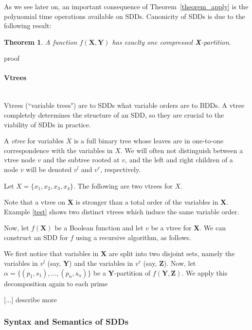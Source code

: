 \documentclass[12]{article}
\newtheorem{theorem}{Theorem}[section]
\newenvironment{proof}[1][Proof]{\begin{trivlist}
\item[\hskip \labelsep {\bfseries #1}]}{\end{trivlist}}
\newenvironment{definition}[1][Definition]{\begin{trivlist}
\item[\hskip \labelsep {\bfseries #1}]}{\end{trivlist}}
\newenvironment{example}[1][Example]{\begin{trivlist}
\item[\hskip \labelsep {\bfseries #1}]}{\end{trivlist}}
\newcommand{\myparagraph}[1]{\paragraph{#1}\mbox{}\\}
\begin{document}
As we see later on, an important consequence of Theorem~\ref{theorem_apply} is the polynomial time operations available on SDDs. Canonicity of SDDs is due to the following result:

\begin{theorem}
A function $f(\textbf{X}, \textbf{Y})$ has exaclty one compressed \textbf{X}-partition.
\end{theorem}
\begin{proof}
proof
\end{proof}

\myparagraph{Vtrees}

Vtrees (``variable trees") are to SDDs what variable orders are to BDDs. A vtree completely determines the structure of an SDD, so they are crucial to the viability of SDDs in practice.

\begin{definition}
A \textit{vtree} for variables $X$ is a full binary tree whose leaves are in one-to-one correspondence with the variables in $X$. We will often not distinguish between a vtree node $v$ and the subtree rooted at $v$, and the left and right children of a node $v$ will be denoted $v^l$ and $v^r$, respectively.
\end{definition}

\begin{example}
Let $X = \{x_1, x_2, x_3, x_4\}$. The following are two vtrees for $X$. 
\end{example}

Note that a vtree on \textbf{X} is stronger than a total order of the variables in \textbf{X}. Example \ref{test} shows two distinct vtrees which induce the same variable order. 

Now, let $f(\textbf{X})$ be a Boolean function and let $v$ be a vtree for \textbf{X}. We can construct an SDD for $f$ using a recursive algorithm, as follows.

 We first notice that variables in \textbf{X} are split into two disjoint sets, namely the variables in $v^l$ (say, \textbf{Y}) and the variables in $v^r$ (say, \textbf{Z}). Now, let $\alpha =  \{(p_1, s_1),...,(p_n, s_n)\}$ be a \textbf{Y}-partition of $f(\textbf{Y}, \textbf{Z})$. We apply this decomposition again to each prime 

[...] describe more
\subsubsection{Syntax and Semantics of SDDs}
\end{document}
